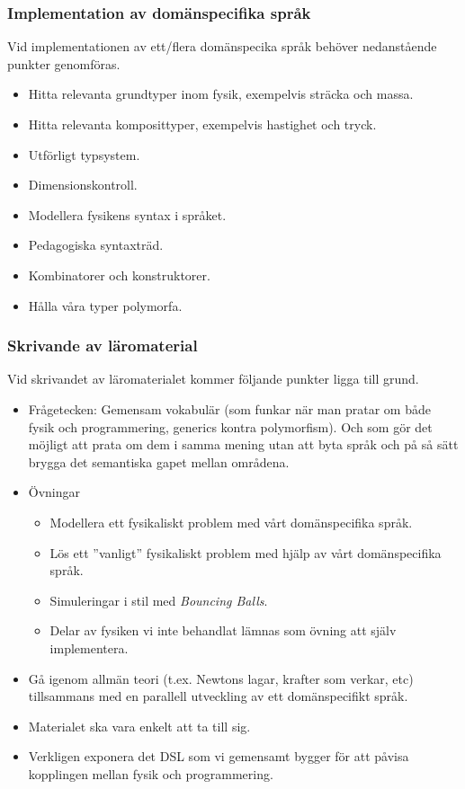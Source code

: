 \documentclass[12pt,a4paper]{article}
\begin{document}
\subsubsection*{Implementation av domänspecifika språk}

Vid implementationen av ett/flera domänspecika språk behöver nedanstående punkter genomföras.

\begin{itemize}
    \item Hitta relevanta grundtyper inom fysik, exempelvis sträcka och massa.
    \item Hitta relevanta komposittyper, exempelvis hastighet och tryck.
    \item Utförligt typsystem.
    \item Dimensionskontroll.
    \item Modellera fysikens syntax i språket.
    \item Pedagogiska syntaxträd.
    \item Kombinatorer och konstruktorer.
    \item Hålla våra typer polymorfa.
\end{itemize}

\subsubsection*{Skrivande av läromaterial}

Vid skrivandet av läromaterialet kommer följande punkter ligga till grund.

\begin{itemize}
    \item Frågetecken: Gemensam vokabulär (som funkar när man pratar om både fysik och programmering, generics kontra polymorfism). Och som gör det möjligt att prata om dem i samma mening utan att byta språk och på så sätt brygga det semantiska gapet mellan områdena.
    \item Övningar
        \begin{itemize}
            \item Modellera ett fysikaliskt problem med vårt domänspecifika språk.
            \item Lös ett ''vanligt'' fysikaliskt problem med hjälp av vårt domänspecifika språk.
            \item Simuleringar i stil med \textit{Bouncing Balls}.
            \item Delar av fysiken vi inte behandlat lämnas som övning att själv implementera.
        \end{itemize}
    \item Gå igenom allmän teori (t.ex. Newtons lagar, krafter som verkar, etc) tillsammans med en parallell utveckling av ett domänspecifikt språk.
    \item Materialet ska vara enkelt att ta till sig.
    \item Verkligen exponera det DSL som vi gemensamt bygger för att påvisa kopplingen mellan fysik och programmering.
\end{itemize}
\end{document}
